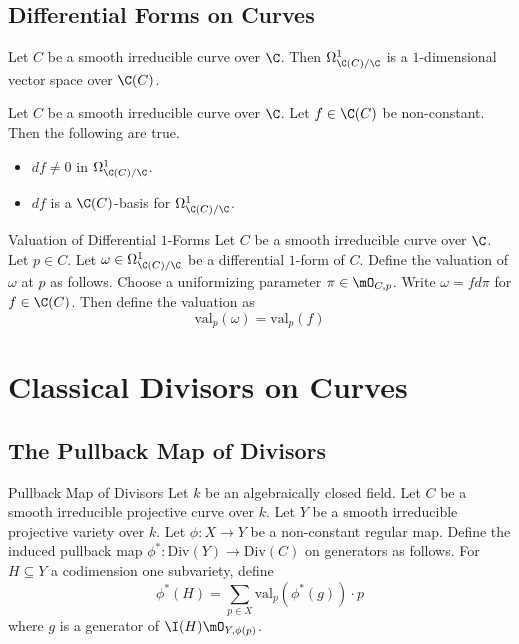 \documentclass[a4paper]{article}
\begin{document}
\subsection{Differential Forms on Curves}
\begin{prp}{}{} Let $C$ be a smooth irreducible curve over $\C$. Then $\Omega_{\C(C)/\C}^1$ is a $1$-dimensional vector space over $\C(C)$. 
\end{prp}

\begin{prp}{}{} Let $C$ be a smooth irreducible curve over $\C$. Let $f\in\C(C)$ be non-constant. Then the following are true. 
\begin{itemize}
\item $df\neq 0$ in $\Omega_{\C(C)/\C}^1$. 
\item $df$ is a $\C(C)$-basis for $\Omega_{\C(C)/\C}^1$. 
\end{itemize}
\end{prp}

\begin{defn}{Valuation of Differential $1$-Forms}{} Let $C$ be a smooth irreducible curve over $\C$. Let $p\in C$. Let $\omega\in\Omega_{\C(C)/\C}^1$ be a differential $1$-form of $C$. Define the valuation of $\omega$ at $p$ as follows. Choose a uniformizing parameter $\pi\in\mO_{C,p}$. Write $\omega=fd\pi$ for $f\in\C(C)$. Then define the valuation as $$\text{val}_p(\omega)=\text{val}_p(f)$$
\end{defn}

\pagebreak
\section{Classical Divisors on Curves}
\subsection{The Pullback Map of Divisors}
\begin{defn}{Pullback Map of Divisors}{} Let $k$ be an algebraically closed field. Let $C$ be a smooth irreducible projective curve over $k$. Let $Y$ be a smooth irreducible projective variety over $k$. Let $\phi:X\to Y$ be a non-constant regular map. Define the induced pullback map $\phi^\ast:\text{Div}(Y)\to\text{Div}(C)$ on generators as follows. For $H\subseteq Y$ a codimension one subvariety, define $$\phi^\ast(H)=\sum_{p\in X}\text{val}_p(\phi^\ast(g))\cdot p$$ where $g$ is a generator of $\I(H)\mO_{Y,\phi(p)}$. 
\end{defn}
\end{document}
